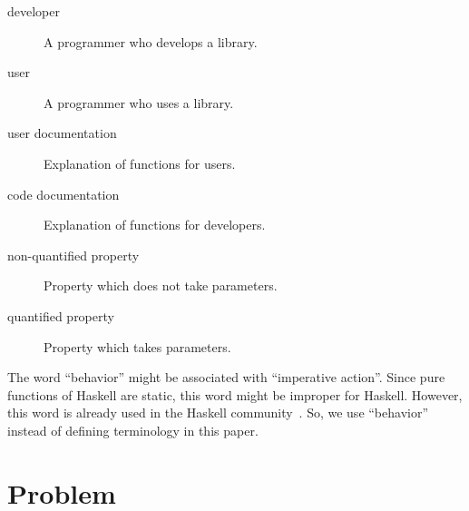 \documentclass[preprint]{sigplanconf}
\begin{document}
\begin{description}
\item[developer]
    A programmer who develops a library.

\item[user]
    A programmer who uses a library.


\item[user documentation]
    Explanation of functions for users.
\item[code documentation]
    Explanation of functions for developers.

\item[non-quantified property]
    Property which does not take parameters.

\item[quantified property]
    Property which takes parameters.

\end{description}

\noindent The word ``behavior'' might be associated with ``imperative
action''.  Since pure functions of Haskell are static, this word might
be improper for Haskell.  However, this word is already used in the
Haskell community~\cite{typeclassopedia}.  So, we use ``behavior''
instead of defining terminology in this paper.

%
%
%

\section{Problem}
\label{sec:problem}
\end{document}
